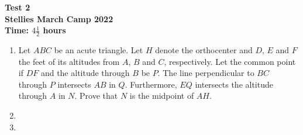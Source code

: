 \documentclass{article}
\begin{document}
\thispagestyle{empty}

\begin{center}
  \textbf{\Large Test 2}
  \\ \vspace{1em}
  \textbf{\large Stellies March Camp 2022}
  \\ \vspace{1em}
  \textbf{\large Time: $4\frac{1}{2}$ hours}
\end{center}

\vspace{24pt}

\begin{enumerate}

\item %
Let $ABC$ be an acute triangle. Let $H$ denote the orthocenter and $D$, $E$ and $F$ the feet of its altitudes from $A$, $B$ and $C$, respectively. Let the common point if $DF$ and the altitude through $B$ be $P$. The line perpendicular to $BC$ through $P$ intersects $AB$ in $Q$. Furthermore, $EQ$ intersects the altitude through $A$ in $N$.	Prove that $N$ is the midpoint of $AH$. 


\item %


\item %


\end{enumerate}

\vfill
\centering
\begin{BVerbatim}
\end{BVerbatim}
\end{document}
